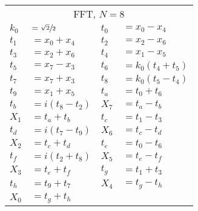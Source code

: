 \begin{tabular}{|p{4.3pt}l|p{4.3pt}l|}\toprule \multicolumn{4}{|c|}{FFT, $N=8$} \\
$k_0 $ &$= \sfrac{\sqrt{2}}{2}$ & $t_0 $ &$= x_0 - x_4$\\ 
$t_1 $ &$= x_0 + x_4$ & $t_2 $ &$= x_2 - x_6$\\ 
$t_3 $ &$= x_2 + x_6$ & $t_4 $ &$= x_1 - x_5$\\ 
$t_5 $ &$= x_7 - x_3$ & $t_6 $ &$= k_0(t_4 + t_5)$\\ 
$t_7 $ &$= x_7 + x_3$ & $t_8 $ &$= k_0(t_5 - t_4)$\\ 
$t_9 $ &$= x_1 + x_5$ & $t_a $ &$= t_0 + t_6$\\ 
$t_b $ &$= i(t_8 - t_2)$ & $X_7 $ &$= t_a - t_b$\\ 
$X_1 $ &$= t_a + t_b$ & $t_c $ &$= t_1 - t_3$\\ 
$t_d $ &$= i(t_7 - t_9)$ & $X_6 $ &$= t_c - t_d$\\ 
$X_2 $ &$= t_c + t_d$ & $t_e $ &$= t_0 - t_6$\\ 
$t_f $ &$= i(t_2 + t_8)$ & $X_5 $ &$= t_e - t_f$\\ 
$X_3 $ &$= t_e + t_f$ & $t_g $ &$= t_1 + t_3$\\ 
$t_h $ &$= t_9 + t_7$ & $X_4 $ &$= t_g - t_h$\\ 
$X_0 $ &\multicolumn{3}{l|}{$= t_g + t_h$}\\ 
\bottomrule\end{tabular}
